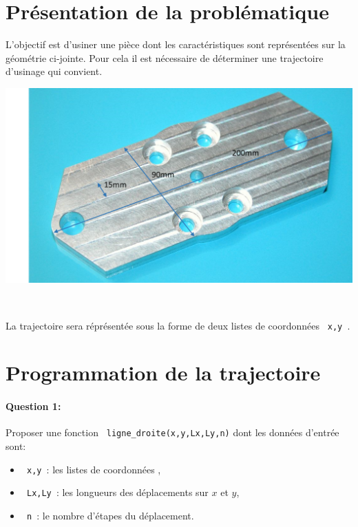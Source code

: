 





\section{Présentation de la problématique}

\begin{minipage}{0.45\linewidth}
L'objectif est d'usiner une pièce dont les caractéristiques sont représentées sur la géométrie ci-jointe. Pour cela il est nécessaire de déterminer une trajectoire d'usinage qui convient.
\end{minipage}\hfill
\begin{minipage}{0.45\linewidth}
\begin{center}
 \includegraphics[width=0.8\linewidth]{img/fig1.png}
\end{center}
\end{minipage}

~\

La trajectoire sera réprésentée sous la forme de deux listes de coordonnées \verb? x,y ?.

\section{Programmation de la trajectoire}

\paragraph{Question 1:} Proposer une fonction \verb? ligne_droite(x,y,Lx,Ly,n)? dont les données d'entrée sont:
\begin{itemize}
 \item \verb? x,y ?: les listes de coordonnées ,
 \item \verb? Lx,Ly ?: les longueurs des déplacements sur $x$ et $y$,
 \item \verb? n ?: le nombre d'étapes du déplacement.
\end{itemize}

